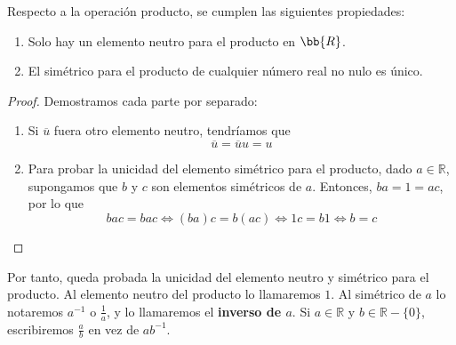 \begin{prop} Respecto a la operación producto, se cumplen las siguientes propiedades:
    \begin{enumerate}
        \item Solo hay un elemento neutro para el producto en $\bb{R}$.
        \item El simétrico para el producto de cualquier número real no nulo es único.
    \end{enumerate}
\end{prop}
\begin{proof} Demostramos cada parte por separado:
\begin{enumerate}
    \item Si $\overline{u}$ fuera otro elemento neutro, tendríamos que
    \begin{equation*}
        \overline{u} = \overline{u}u = u
    \end{equation*}

    \item Para probar la unicidad del elemento simétrico para el producto, dado $a \in \mathbb{R}$, supongamos que $b$ y $c$ son elementos simétricos de $a$.
    Entonces, $ba=1=ac$, por lo que
    \begin{equation*}
        bac=bac \Longleftrightarrow (ba)c=b(ac) \Longleftrightarrow 1c=b1 \Longleftrightarrow b=c
    \end{equation*}
\end{enumerate}
\end{proof}

Por tanto, queda probada la unicidad del elemento neutro y simétrico para el producto. Al elemento neutro del producto lo llamaremos $1$.
Al simétrico de $a$ lo notaremos $a^{-1}$ o $\frac{1}{a}$, y lo llamaremos el \textbf{inverso de $a$}.
Si $a \in \mathbb{R}$ y $b \in \mathbb{R}-\{0\}$, escribiremos $\frac{a}{b}$ en vez de $ab^{-1}$.


